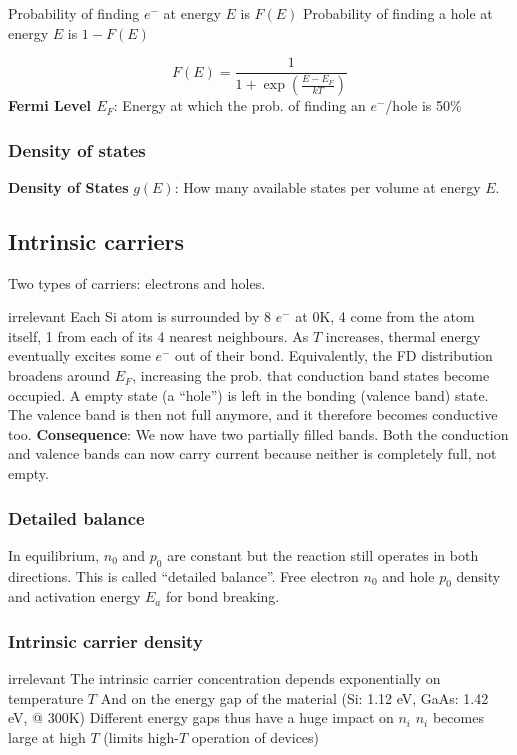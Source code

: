 \documentclass[a4paper, fontsize=8pt, landscape, DIV=1]{scrartcl}
\newcommand{\makeultracompact}{irrelevant}
\begin{document}
\begin{multicols*}{4}
  Probability of finding $e^-$ at energy $E$ is $F(E)$
  Probability of finding a hole at energy $E$ is $1-F(E)$

  \[F(E) = \frac{1}{1+\exp\left(\frac{E-E_F}{kT}\right)}\]
  \textbf{Fermi Level $E_F$}: Energy at which the prob. of finding an $e^-$/hole is 50\%

  \subsubsection{Density of states}
  \textbf{Density of States} $g(E)$: How many available states per volume at energy $E$.
  
  \subsection{Intrinsic carriers}
  Two types of carriers: electrons and holes.
  
  \ifdefined\makeultracompact\else
    Each Si atom is surrounded by 8 $e^-$ at 0K, 4 come from the atom itself, 1 from each of its 4 nearest neighbours.
    As $T$ increases, thermal energy eventually excites some $e^-$ out of their bond. 
    Equivalently, the FD distribution broadens around $E_F$, increasing the prob. that conduction band states become occupied.
    A empty state (a ``hole'') is left in the bonding (valence band) state. 
    The valence band is then not full anymore, and it therefore becomes conductive too.
    \textbf{Consequence}: We now have two partially filled bands. 
    Both the conduction and valence bands can now carry current because neither is completely full, not empty.
  \fi
  
  \subsubsection{Detailed balance}
  In equilibrium, $n_0$ and $p_0$ are constant but the reaction still operates in both directions. This is called ``detailed balance''.
  Free electron $n_0$ and hole $p_0$ density and activation energy $E_a$ for bond breaking.

  \subsubsection{Intrinsic carrier density}
  \ifdefined\makeultracompact\else
    The intrinsic carrier concentration depends exponentially on temperature $T$
    And on the energy gap of the material (Si: 1.12 eV, GaAs: 1.42 eV, @ 300K)
    Different energy gaps thus have a huge impact on $n_i$
    $n_i$ becomes large at high $T$ (limits high-$T$ operation of devices)
  \fi


\end{multicols*}
\end{document}
